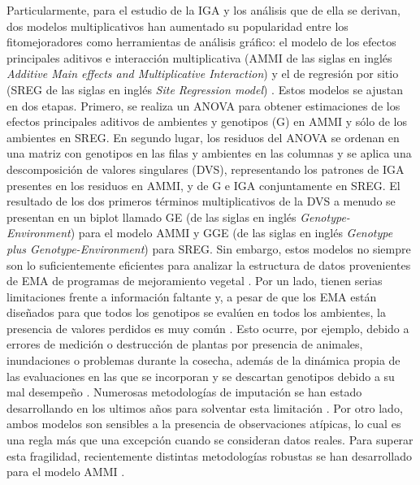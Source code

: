 Particularmente, para el estudio de la IGA y los análisis que de ella se derivan, dos modelos multiplicativos han aumentado su popularidad entre los fitomejoradores como herramientas de análisis gráfico: el modelo de los efectos principales aditivos e interacción multiplicativa (AMMI de las siglas en inglés \emph{Additive Main effects and Multiplicative Interaction}) \citep{Kempton1984,Gauch1988} y el de regresión por sitio (SREG de las siglas en inglés \emph{Site Regression model}) \citep{Corneliusetal1996, CrossaCornelius1997}. Estos modelos se ajustan en dos etapas. Primero, se realiza un ANOVA para obtener estimaciones de los efectos principales aditivos de ambientes y genotipos (G) en AMMI y sólo de los ambientes en SREG. En segundo lugar, los residuos del ANOVA se ordenan en una matriz con genotipos en las filas y ambientes en las columnas y se aplica una descomposición de valores singulares (DVS), representando los patrones de IGA presentes en los residuos en AMMI, y de G e IGA conjuntamente en SREG. El resultado de los dos primeros términos multiplicativos de la DVS a menudo se presentan en un biplot llamado GE (de las siglas en inglés \emph{Genotype-Environment}) para el modelo AMMI y GGE (de las siglas en inglés \emph{Genotype plus Genotype-Environment}) para SREG. Sin embargo, estos modelos no siempre son lo suficientemente eficientes para analizar la estructura de datos provenientes de EMA de programas de mejoramiento vegetal \citep{deOliveira2016, Jarquin2016, Hadaschetal2018}. Por un lado, tienen serias limitaciones frente a información faltante y, a pesar de que los EMA están diseñados para que todos los genotipos se evalúen en todos los ambientes, la presencia de valores perdidos es muy común \citep{Woyann2017, Aguate2019}. Esto ocurre, por ejemplo, debido a errores de medición o destrucción de plantas por presencia de animales, inundaciones o problemas durante la cosecha, además de la dinámica propia de las evaluaciones en las que se incorporan y se descartan genotipos debido a su mal desempeño \citep{HillRosenberg1985}. Numerosas metodologías de imputación se han estado desarrollando en los ultimos años para solventar esta limitación \citep{Alarconetal2010, Alarconetal2014, JosseHusson2016, Alarconetal2020}. Por otro lado, ambos modelos son sensibles a la presencia de observaciones atípicas, lo cual es una regla más que una excepción cuando se consideran datos reales. Para superar esta fragilidad, recientemente distintas metodologías robustas se han desarrollado para el modelo AMMI \citep{Rodriguesetal2016}. 

